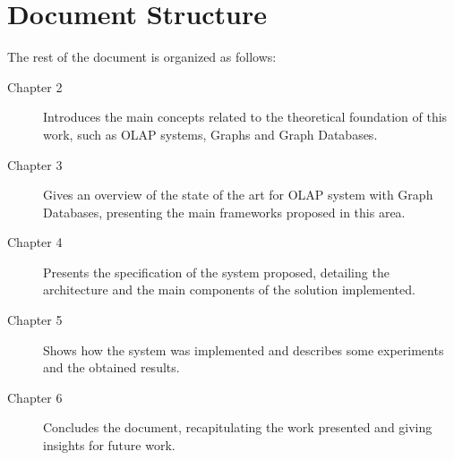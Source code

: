 \section{Document Structure}
The rest of the document is organized as follows:
\begin{description}
\item[Chapter 2] Introduces the main concepts related to the theoretical foundation of this work, such as OLAP systems, Graphs and Graph Databases.
\item[Chapter 3] Gives an overview of the state of the art for OLAP system with Graph Databases, presenting the main frameworks proposed in this area.
\item[Chapter 4] Presents the specification of the system proposed, detailing the architecture and the main components of the solution implemented.
\item[Chapter 5] Shows how the system was implemented and describes some experiments and the obtained results.
\item[Chapter 6] Concludes the document, recapitulating the work presented and giving insights for future work.
\end{description}